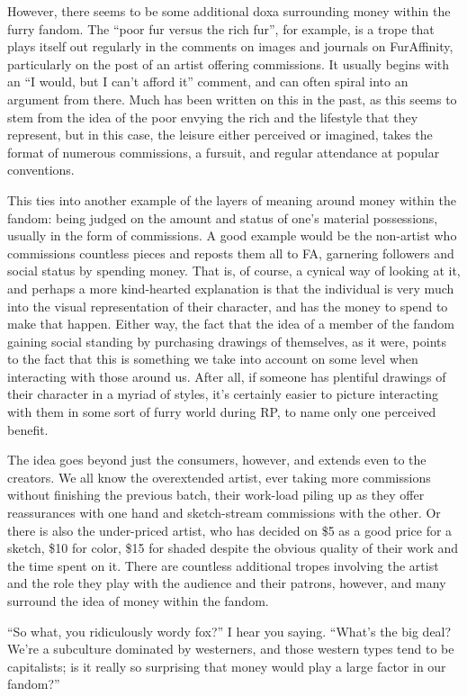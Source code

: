 However, there seems to be some additional doxa surrounding money within the furry fandom. The ``poor fur versus the rich fur'', for example, is a trope that plays itself out regularly in the comments on images and journals on FurAffinity, particularly on the post of an artist offering commissions. It usually begins with an ``I would, but I can't afford it'' comment, and can often spiral into an argument from there. Much has been written on this in the past, as this seems to stem from the idea of the poor envying the rich and the lifestyle that they represent, but in this case, the leisure either perceived or imagined, takes the format of numerous commissions, a fursuit, and regular attendance at popular conventions.

This ties into another example of the layers of meaning around money within the fandom: being judged on the amount and status of one's material possessions, usually in the form of commissions. A good example would be the non-artist who commissions countless pieces and reposts them all to FA, garnering followers and social status by spending money. That is, of course, a cynical way of looking at it, and perhaps a more kind-hearted explanation is that the individual is very much into the visual representation of their character, and has the money to spend to make that happen. Either way, the fact that the idea of a member of the fandom gaining social standing by purchasing drawings of themselves, as it were, points to the fact that this is something we take into account on some level when interacting with those around us. After all, if someone has plentiful drawings of their character in a myriad of styles, it's certainly easier to picture interacting with them in some sort of furry world during RP, to name only one perceived benefit.

The idea goes beyond just the consumers, however, and extends even to the creators. We all know the overextended artist, ever taking more commissions without finishing the previous batch, their work-load piling up as they offer reassurances with one hand and sketch-stream commissions with the other. Or there is also the under-priced artist, who has decided on \$5 as a good price for a sketch, \$10 for color, \$15 for shaded despite the obvious quality of their work and the time spent on it. There are countless additional tropes involving the artist and the role they play with the audience and their patrons, however, and many surround the idea of money within the fandom.

``So what, you ridiculously wordy fox?'' I hear you saying. ``What's the big deal? We're a subculture dominated by westerners, and those western types tend to be capitalists; is it really so surprising that money would play a large factor in our fandom?''

